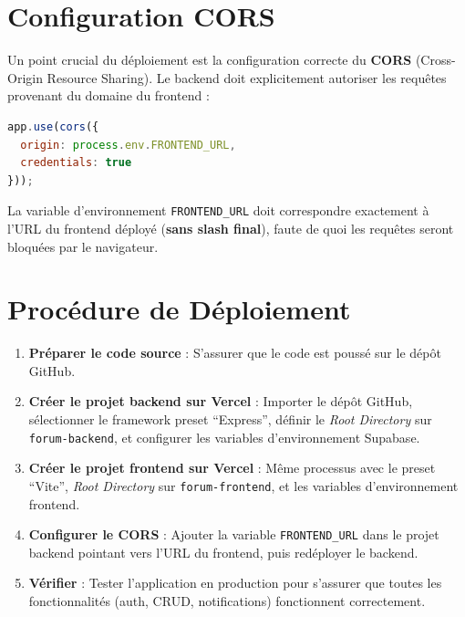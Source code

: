 \documentclass[12pt, a4paper]{report}
\begin{document}
\section{Configuration CORS}

Un point crucial du déploiement est la configuration correcte du \textbf{CORS} (Cross-Origin Resource Sharing). Le backend doit explicitement autoriser les requêtes provenant du domaine du frontend :

\begin{lstlisting}[language=JavaScript, caption={Configuration CORS dans le backend.}]
app.use(cors({
  origin: process.env.FRONTEND_URL,
  credentials: true
}));
\end{lstlisting}

La variable d'environnement \texttt{FRONTEND\_URL} doit correspondre exactement à l'URL du frontend déployé (\textbf{sans slash final}), faute de quoi les requêtes seront bloquées par le navigateur.

\section{Procédure de Déploiement}

\begin{enumerate}
    \item \textbf{Préparer le code source} : S'assurer que le code est poussé sur le dépôt GitHub.
    \item \textbf{Créer le projet backend sur Vercel} : Importer le dépôt GitHub, sélectionner le framework preset ``Express'', définir le \textit{Root Directory} sur \texttt{forum-backend}, et configurer les variables d'environnement Supabase.
    \item \textbf{Créer le projet frontend sur Vercel} : Même processus avec le preset ``Vite'', \textit{Root Directory} sur \texttt{forum-frontend}, et les variables d'environnement frontend.
    \item \textbf{Configurer le CORS} : Ajouter la variable \texttt{FRONTEND\_URL} dans le projet backend pointant vers l'URL du frontend, puis redéployer le backend.
    \item \textbf{Vérifier} : Tester l'application en production pour s'assurer que toutes les fonctionnalités (auth, CRUD, notifications) fonctionnent correctement.
\end{enumerate}


\end{document}
